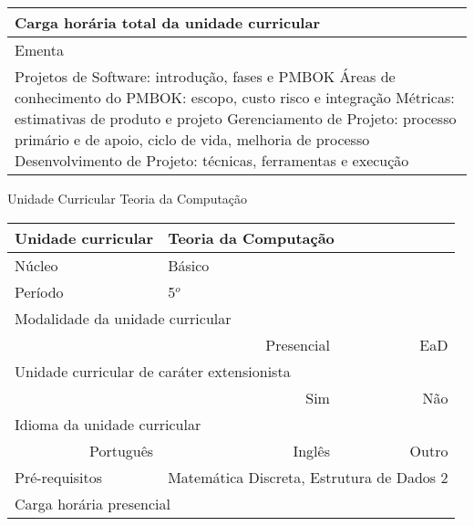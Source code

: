 \begin{quadro}[ht!]
\begin{tabular}{|p{3cm} p{2cm} p{3cm} p{2cm} p{3cm} p{2cm}|}
\multicolumn{5}{|p{13cm}|}{\cellcolor{blue1} Carga horária total da unidade curricular} & \multicolumn{1}{p{1cm}|}{\raggedleft 60	}\\\hline
\multicolumn{6}{|p{15cm}|}{\cellcolor{blue1} Ementa} \\\hline
\hline\multicolumn{6}{|p{15cm}|}{\scriptsize Projetos de Software: introdução, fases e PMBOK Áreas de conhecimento do PMBOK: escopo, custo risco e integração Métricas: estimativas de produto e projeto Gerenciamento de Projeto: processo primário e de apoio, ciclo de vida, melhoria de processo Desenvolvimento de Projeto: técnicas, ferramentas e execução}\\\hline
\hline
	\end{tabular}
\end{quadro}
\begin{quadro}[ht!]
  \centering\scriptsize
\caption{Unidade Curricular Teoria da Computação}
\label{ unit_26 }
\begin{tabular}{|p{3cm} p{2cm} p{3cm} p{2cm} p{3cm} p{2cm}|}\hline
\multicolumn{1}{|p{3cm}|}{\cellcolor{blue1} Unidade curricular} & \multicolumn{5}{p{9cm}|}{ Teoria da Computação }\\\hline
\multicolumn{1}{|p{3cm}|}{\cellcolor{blue1} Núcleo} & \multicolumn{5}{p{11.5cm}|}{ Básico }\\\hline
\multicolumn{1}{|p{3cm}|}{\cellcolor{blue1} Período} & \multicolumn{5}{p{9cm}|}{ 5$^o$ }\\\hline
\multicolumn{6}{|p{15cm}|}{\cellcolor{blue1} Modalidade da unidade curricular} \\\hline
\multicolumn{2}{|r}{		} &  \multicolumn{2}{r}{Presencial \XBox } & \multicolumn{2}{r|}{EaD \Square	} \\\hline
\multicolumn{6}{|p{15cm}|}{\cellcolor{blue1} Unidade curricular de caráter extensionista} \\\hline
\multicolumn{4}{|r}{			Sim \Square	} & \multicolumn{2}{r|}{	Não \XBox	}\\\hline
\multicolumn{6}{|p{15cm}|}{\cellcolor{blue1} Idioma da unidade curricular} \\ \hline
\multicolumn{2}{|r}{	Português \XBox	} &  \multicolumn{2}{r}{	Inglês \Square	} & \multicolumn{2}{r|}{	Outro \Square	} \\ \hline
\multicolumn{1}{|p{3cm}|}{\cellcolor{blue1} Pré-requisitos} & \multicolumn{5}{p{9cm}|}{ Matemática Discreta, Estrutura de Dados 2 }\\ \hline
\multicolumn{6}{|p{15cm}|}{\cellcolor{blue1} Carga horária presencial} \\ \hline

\end{tabular}
\end{quadro}
